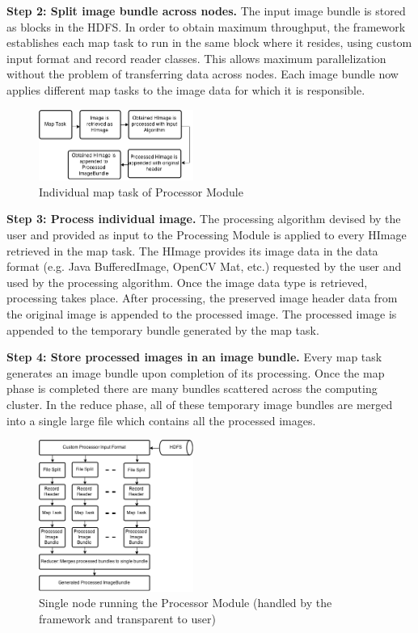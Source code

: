 \documentclass[conference]{IEEEtran}
\begin{document}
\textbf{Step 2: Split image bundle across nodes.} The input image
bundle is stored as blocks in the HDFS.  In order to obtain maximum
throughput, the framework establishes each map task to run in the same
block where it resides, using custom input format and record reader
classes. This allows maximum parallelization without the problem of
transferring data across nodes.  Each image bundle now applies
different map tasks to the image data for which it is responsible.

\begin{figure}[h]
  \centering
  \includegraphics[width=0.45\textwidth]{pro-map}
  \caption{Individual map task of Processor Module}
  \label{fig:pro-map}
\end{figure}

\textbf{Step 3: Process individual image.}  The processing algorithm
devised by the user and provided as input to the Processing Module is
applied to every HImage retrieved in the map task.  The HImage
provides its image data in the data format (e.g. Java BufferedImage,
OpenCV Mat, etc.) requested by the user and used by the processing
algorithm. Once the image data type is retrieved, processing takes
place. After processing, the preserved image header data from the
original image is appended to the processed image. The processed image
is appended to the temporary bundle generated by the map task.

\textbf{Step 4: Store processed images in an image bundle.} Every map
task generates an image bundle upon completion of its processing.
Once the map phase is completed there are many bundles scattered
across the computing cluster.  In the reduce phase, all of these
temporary image bundles are merged into a single large file which
contains all the processed images.

\begin{figure}[h]
  \centering
  \includegraphics[width=0.45\textwidth]{pro-node}
  \caption{Single node running the Processor Module (handled by
    the framework and transparent to user)}
  \label{fig:pro-node}
\end{figure}
\end{document}

